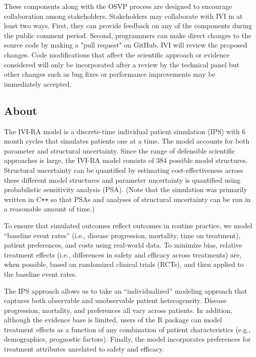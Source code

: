 \documentclass[11pt,final,fleqn]{article}\usepackage[]{graphicx}\usepackage[]{color}
\theoremstyle{plain}
\newcommand\CPP{{C\texttt{++}}}
\newcommand\R{{\textsf{R}}}
\begin{document}
These components along with the OSVP process are designed to encourage collaboration among stakeholders. Stakeholders may collaborate with IVI in at least two ways. First, they can provide feedback on any of the components during the public comment period. Second, programmers can make direct changes to the source code by making a "pull request" on GitHub. IVI will review the proposed changes. Code modifications that affect the scientific approach or evidence considered will only be incorporated after a review by the technical panel but other changes such as bug fixes or performance improvements may be immediately accepted.

\subsection{About}
The IVI-RA model is a discrete-time individual patient simulation (IPS) with 6 month cycles that simulates patients one at a time. The model accounts for both parameter and structural uncertainty. Since the range of defensible scientific approaches is large, the IVI-RA model consists of 384 possible model structures. Structural uncertainty can be quantified by estimating cost-effectiveness across these different model structures and parameter uncertainty is quantified using probabilistic sensitivity analysis (PSA). (Note that the simulation was primarily written in \CPP{} so that PSAs and analyses of structural uncertainty can be run in a reasonable amount of time.)

To ensure that simulated outcomes reflect outcomes in routine practice, we model ``baseline event rates'' (i.e., disease progression, mortality, time on treatment), patient preferences, and costs using real-world data. To minimize bias, relative treatment effects (i.e., differences in safety and efficacy across treatments) are, when possible, based on randomized clinical trials (RCTs), and then applied to the baseline event rates.

The IPS approach allows us to take an ``individualized'' modeling approach that captures both observable and unobservable patient heterogeneity. Disease progression, mortality, and preferences all vary across patients. In addition, although the evidence base is limited, users of the \R{} package can model treatment effects as a function of any combination of patient characteristics (e.g., demographics, prognostic factors). Finally, the model incorporates preferences for treatment attributes unrelated to safety and efficacy. 
\end{document}
